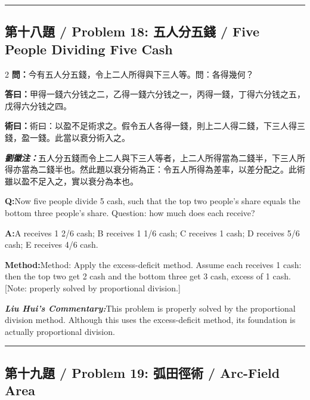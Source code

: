 \documentclass[11pt,a4paper]{article}
\newcommand{\cnwen}{\textcolor{cnlabelfg}{\textbf{問：}}}
\newcommand{\cnda}{\textbf{答曰：}}
\newcommand{\cnshu}{\textcolor{cnlabelfg}{\textbf{術曰：}}}
\newcommand{\cnzhu}{\textcolor{commentarycolor}{\textit{\textbf{劉徽注：}}}}
\newcommand{\enwen}{\textcolor{enlabelfg}{\textbf{Q:}}}
\newcommand{\enda}{\textcolor{enlabelfg}{\textbf{A:}}}
\newcommand{\enshu}{\textcolor{enlabelfg}{\textbf{Method:}}}
\newcommand{\enzhu}{\textcolor{enlabelfg}{\textit{\textbf{Liu Hui's Commentary:}}}}
\begin{document}
\bigskip\hrule\bigskip

\subsection{第十八題 / Problem 18: 五人分五錢 / Five People Dividing Five Cash}

\begin{paracol}{2}
\switchcolumn[0]
\cnwen 今有五人分五錢，令上二人所得與下三人等。問：各得幾何？

\cnda 甲得一錢六分钱之二，乙得一錢六分钱之一，丙得一錢，丁得六分钱之五，戊得六分钱之四。

\cnshu 術曰：以盈不足術求之。假令五人各得一錢，則上二人得二錢，下三人得三錢，盈一錢。此當以衰分術入之。

\cnzhu 五人分五錢而令上二人與下三人等者，上二人所得當為二錢半，下三人所得亦當為二錢半也。然此題以衰分術為正：令五人所得為差率，以差分配之。此術雖以盈不足入之，實以衰分為本也。

\switchcolumn[1]
\enwen Now five people divide 5 cash, such that the top two people's share equals the bottom three people's share. Question: how much does each receive?

\enda A receives 1 2/6 cash; B receives 1 1/6 cash; C receives 1 cash; D receives 5/6 cash; E receives 4/6 cash.

\enshu Method: Apply the excess-deficit method. Assume each receives 1 cash: then the top two get 2 cash and the bottom three get 3 cash, excess of 1 cash. [Note: properly solved by proportional division.]

\enzhu This problem is properly solved by the proportional division method. Although this uses the excess-deficit method, its foundation is actually proportional division.
\end{paracol}

\bigskip\hrule\bigskip

\subsection{第十九題 / Problem 19: 弧田徑術 / Arc-Field Area}
\end{document}
